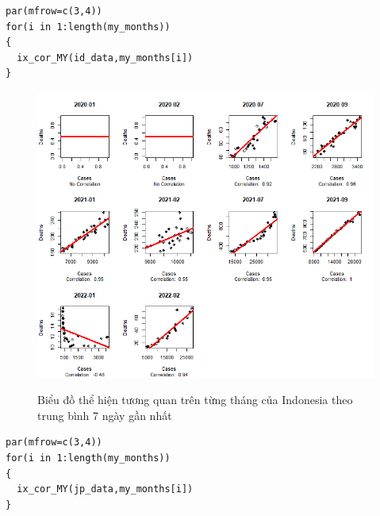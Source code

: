 \documentclass[a4paper]{article}
\theoremstyle{definition}
\begin{document}
\begin{enumerate}[i)]
\begin{enumerate}[1)]
        \lstset{
    title=Source code for Indonesia}
    \newpage
\begin{lstlisting}[frame=single]  
par(mfrow=c(3,4))
for(i in 1:length(my_months))
{
  ix_cor_MY(id_data,my_months[i])
}
\end{lstlisting}
\begin{figure}[h!]
	\begin{center}
	    \includegraphics[scale=0.8]{Images/IV/Indo (avg7).png}
        \label{fig:my_label}
	\end{center}
\end{figure}
\begin{figure}[h!]
    \begin{center}
	    \caption{Biểu đồ thể hiện tương quan trên từng tháng của Indonesia theo trung bình 7 ngày gần nhất}
	\end{center}
\end{figure}
\newpage
\lstset{
    title=Source code for Japan}
\begin{lstlisting}[frame=single]  
par(mfrow=c(3,4))
for(i in 1:length(my_months))
{
  ix_cor_MY(jp_data,my_months[i])
}
\end{lstlisting}
\begin{figure}[h!]
	\begin{center}

\end{center}
\end{figure}
\end{enumerate}
\end{enumerate}
\end{document}
